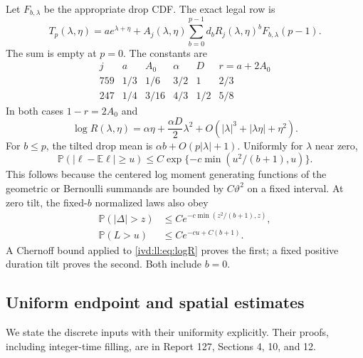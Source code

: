 \documentclass[11pt,letterpaper]{article}
\theoremstyle{remark}\newtheorem{remark}[theorem]{Remark}
\numberwithin{equation}{section}
\newcommand{\Prob}{\mathbb P}\newcommand{\E}{\mathbb E}
\begin{document}
Let $F_{b,\lambda}$ be the appropriate drop CDF. The exact legal row is
\begin{equation}\label{ivd:ll:eq:row}
 T_p(\lambda,\eta)=a e^{\lambda+\eta}
  +A_j(\lambda,\eta)\sum_{b=0}^{p-1}
    d_bR_j(\lambda,\eta)^b F_{b,\lambda}(p-1).
\end{equation}
The sum is empty at $p=0$. The constants are
\[
\begin{array}{c|ccccc}
 j&a&A_0&\alpha&D&r=a+2A_0\\\hline
 759&1/3&1/6&3/2&1&2/3\\
 247&1/4&3/16&4/3&1/2&5/8
\end{array}
\]
In both cases $1-r=2A_0$ and
\begin{equation}\label{ivd:ll:eq:logR}
 \log R(\lambda,\eta)=\alpha\eta+\frac{\alpha D}{2}\lambda^2
           +O(|\lambda|^3+|\lambda\eta|+\eta^2).
\end{equation}
For $b\le p$, the tilted drop mean is
$\alpha b+O(p|\lambda|+1)$. Uniformly for $\lambda$ near zero,
\begin{equation}\label{ivd:ll:eq:drop-tail}
 \Prob(|\ell-\E\ell|\ge u)
 \le C\exp\{-c\min(u^2/(b+1),u)\}.
\end{equation}
This follows because the centered log moment generating functions of
the geometric or Bernoulli summands are bounded by $C\vartheta^2$
on a fixed interval. At zero tilt, the fixed-$b$ normalized laws also obey
\begin{align}
 \Prob(|\Delta|>z)&\le C e^{-c\min(z^2/(b+1),z)},\label{ivd:ll:eq:jump-tail}\\
 \Prob(L>u)&\le C e^{-cu+C(b+1)}.\label{ivd:ll:eq:clock-tail}
\end{align}
A Chernoff bound applied to \eqref{ivd:ll:eq:logR} proves the first;
a fixed positive duration tilt proves the second. Both include $b=0$.

\subsection{Uniform endpoint and spatial estimates}
We state the discrete inputs with their uniformity explicitly.
Their proofs, including integer-time filling, are in Report 127,
Sections 4, 10, and 12.
\end{document}
